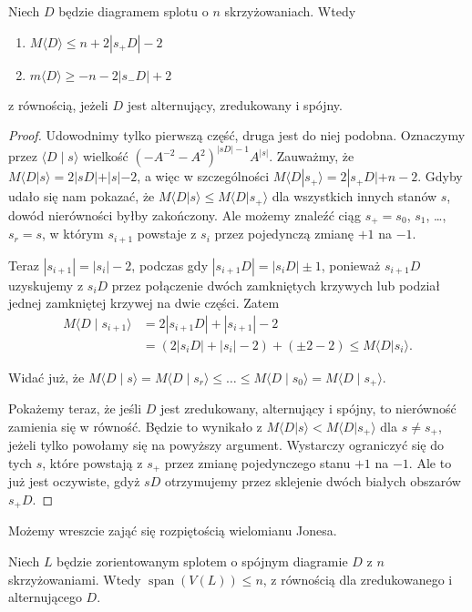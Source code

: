 \begin{lemma}
Niech $D$ będzie diagramem splotu o $n$ skrzyżowaniach.
Wtedy
\begin{enumerate}
\item $M \langle D \rangle \le n+2|s_+D|-2$
\item $m \langle D \rangle \ge -n-2|s_-D|+2$
\end{enumerate}
z równością, jeżeli $D$ jest alternujący, zredukowany i spójny.
\end{lemma}

\begin{proof}
Udowodnimy tylko pierwszą część, druga jest do niej podobna.
Oznaczymy przez $\langle D \mid s \rangle$ wielkość $(-A^{-2}-A^2)^{|sD|-1}A^{|s|}$.
Zauważmy, że $M\langle D|s\rangle=2|sD|+|s|-2$,
a więc w szczególności $M\langle D|s_+\rangle=2|s_+D|+n-2$.
Gdyby udało się nam pokazać, że $M\langle D|s\rangle \le M\langle D|s_+\rangle$
dla wszystkich innych stanów $s$, dowód nierówności byłby zakończony.
Ale możemy znaleźć ciąg $s_+ = s_0$, $s_1$, \ldots, $s_r=s$,
w którym $s_{i+1}$ powstaje z $s_i$ przez pojedynczą zmianę $+1$ na $-1$.

Teraz $|s_{i+1}|=|s_i|-2$, podczas gdy $|s_{i+1}D|=|s_iD|\pm 1$,
ponieważ $s_{i+1}D$ uzyskujemy z $s_{i}D$ przez połączenie dwóch zamkniętych krzywych lub podział jednej zamkniętej krzywej na dwie części.
Zatem
\begin{align*}
    M \langle D \mid s_{i+1} \rangle & =
    2|s_{i+1}D|+|s_{i+1}|-2 \\ & =
    (2|s_iD| + |s_i| -2 ) + (\pm 2-2) \le
    M \langle D|s_i\rangle.
\end{align*}

Widać już, że $M\langle D \mid s\rangle =M\langle D \mid s_r\rangle \le\ldots\le M\langle D \mid s_0\rangle=M\langle D \mid s_+\rangle$.

Pokażemy teraz, że jeśli $D$ jest zredukowany, alternujący i spójny, to nierówność zamienia się w równość.
Będzie to wynikało z  $M\langle D|s\rangle<M\langle D| s_+\rangle$
dla $s\neq s_+$, jeżeli tylko powołamy się na powyższy argument.
Wystarczy ograniczyć się do tych $s$, które powstają z $s_+$ przez zmianę pojedynczego stanu $+1$ na $-1$.
Ale to już jest oczywiste, gdyż $sD$ otrzymujemy przez sklejenie dwóch białych obszarów $s_+ D$.
\end{proof}

Możemy wreszcie zająć się rozpiętością wielomianu Jonesa.

\begin{theorem}
Niech $L$ będzie zorientowanym splotem o spójnym diagramie $D$ z $n$ skrzyżowaniami.
Wtedy $\operatorname{span}(V(L)) \le n$, z równością dla zredukowanego i alternującego $D$.
\end{theorem}

